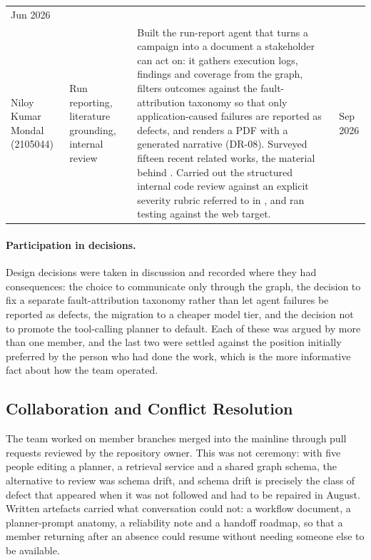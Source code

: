 \begin{xltabular}{\textwidth}{@{}>{\hsize}Y>{\hsize}Y>{\hsize}Y>{\hsize}Y@{}}
    Jun 2026 \\
  \addlinespace
  Niloy Kumar Mondal (2105044) &
    Run reporting, literature grounding, internal review &
    Built the run-report agent that turns a campaign into a document a stakeholder can act on: it gathers execution logs, findings and coverage from the graph, filters outcomes against the fault-attribution taxonomy so that only application-caused failures are reported as defects, and renders a PDF with a generated narrative (DR-08). Surveyed fifteen recent related works, the material behind . Carried out the structured internal code review against an explicit severity rubric referred to in , and ran testing against the web target. &
    Sep 2026 \\
\end{xltabular}
\endgroup

\paragraph{Participation in decisions.} Design decisions were taken in
discussion and recorded where they had consequences: the choice to communicate
only through the graph, the decision to fix a separate fault-attribution
taxonomy rather than let agent failures be reported as defects, the migration
to a cheaper model tier, and the decision not to promote the tool-calling
planner to default. Each of these was argued by more than one member, and the
last two were settled against the position initially preferred by the person
who had done the work, which is the more informative fact about how the team
operated.

\subsection{Collaboration and Conflict Resolution}
\label{sec:collaboration}

The team worked on member branches merged into the mainline through pull
requests reviewed by the repository owner. This was not ceremony: with five
people editing a planner, a retrieval service and a shared graph schema, the
alternative to review was schema drift, and schema drift is precisely the class
of defect that appeared when it was not followed and had to be repaired in
August. Written artefacts carried what conversation could not: a workflow
document, a planner-prompt anatomy, a reliability note and a handoff roadmap,
so that a member returning after an absence could resume without needing
someone else to be available.


